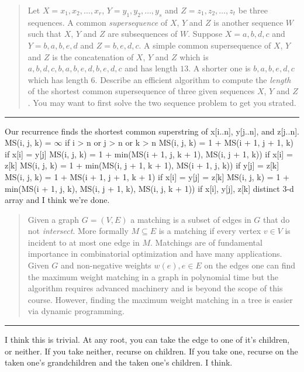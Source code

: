 \documentclass[11pt]{article}
\begin{document}

\begin{quote}
Let $X = x_1,x_2,\ldots,x_r$, $Y = y_1,y_2,\ldots,y_s$ and $Z =
  z_1,z_2,\ldots,z_t$ be three sequences. A common {\em supersequence}
  of $X$, $Y$ and $Z$ is another sequence $W$ such that $X$, $Y$ and $Z$
  are subsequences of $W$. Suppose $X = a,b,d,c$ and $Y = b,a,b,e,d$ and $Z =
  b, e, d, c$. A simple common supersequence of $X$, $Y$ and $Z$ is
  the concatenation of $X$, $Y$ and $Z$ which is
  $a,b,d,c,b,a,b,e,d,b,e,d,c$ and has length $13$. A shorter one is
  $b, a, b, e, d, c$ which has length $6$.  Describe an efficient
  algorithm to compute the {\em length} of the shortest common
  supersequence of three given sequences $X$, $Y$ and $Z$. You may want to
  first solve the two sequence problem to get you strated.
\end{quote}
\hrule



\begin{solution}
    Our recurrence finds the shortest common superstring of x[i..n], y[j..n], and z[j..n]. 
    MS(i, j, k) = $\infty$ if i > n or j > n or k > n
    MS(i, j, k) = 1 + MS(i + 1, j + 1, k) if x[i] = y[j]
    MS(i, j, k) = 1 + min(MS(i + 1, j, k + 1), MS(i, j + 1, k)) if x[i] = z[k]
    MS(i, j, k) = 1 + min(MS(i, j + 1, k + 1), MS(i + 1, j, k)) if y[j] = z[k]
    MS(i, j, k) = 1 + MS(i + 1, j + 1, k + 1) if x[i] = y[j] = z[k]
    MS(i, j, k) = 1 + min(MS(i + 1, j, k), MS(i, j + 1, k), MS(i, j, k + 1)) if x[i], y[j], z[k] distinct
    3-d array and I think we're done.
\end{solution}


\begin{quote}
Given a graph $G=(V,E)$ a matching is a subset of edges in $G$
  that do not \emph{intersect}. More formally $M \subseteq E$ is a
  matching if every vertex $v \in V$ is incident to at most one edge
  in $M$. Matchings are of fundamental importance in combinatorial
  optimization and have many applications. Given $G$ and non-negative
  weights $w(e), e \in E$ on the edges one can find the maximum weight
  matching in a graph in polynomial time but the algorithm requires
  advanced machinery and is beyond the scope of this course. However,
  finding the maximum weight matching in a tree is easier via dynamic
  programming. 
\end{quote}
\hrule



\begin{solution}
    I think this is trivial. At any root, you can take the edge to one of it's children, or neither. If you take neither, recurse on children. If you take one, recurse on the taken one's grandchildren and the taken one's children. I think.
\end{solution}
\end{document}
